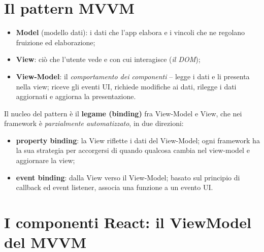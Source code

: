 \section{Il pattern MVVM}

\begin{definizione}
\begin{itemize}
  \item \textbf{Model} (modello dati): i dati che l'app elabora e i vincoli che ne regolano
        fruizione ed elaborazione;
  \item \textbf{View}: ci\`o che l'utente vede e con cui interagisce (\emph{il DOM});
  \item \textbf{View-Model}: il \emph{comportamento dei componenti} -- legge i dati e li
        presenta nella view; riceve gli eventi UI, richiede modifiche ai dati, rilegge i dati
        aggiornati e aggiorna la presentazione.
\end{itemize}
Il nucleo del pattern \`e il \textbf{legame (binding)} fra View-Model e View, che nei
framework \`e \emph{parzialmente automatizzato}, in due direzioni:
\begin{itemize}
  \item \textbf{property binding}: la View riflette i dati del View-Model; ogni framework ha
        la sua strategia per accorgersi di quando qualcosa cambia nel view-model e aggiornare
        la view;
  \item \textbf{event binding}: dalla View verso il View-Model; basato sul principio di
        callback ed event listener, associa una funzione a un evento UI.
\end{itemize}
\end{definizione}

\section{I componenti React: il ViewModel del MVVM}

